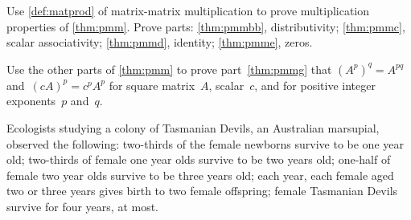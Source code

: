 \begin{exercise} \label{ex:} 
Use \autoref{def:matprod} of matrix-matrix multiplication to prove multiplication properties of \autoref{thm:pmm}. 
Prove parts: \ref{thm:pmmbb}, distributivity; \ref{thm:pmmc}, scalar associativity; \ref{thm:pmmd}, identity; \ref{thm:pmme}, zeros.
\end{exercise}

\begin{exercise} \label{ex:} 
Use the other parts of \autoref{thm:pmm} to prove part~\ref{thm:pmmg} that \((A^p)^q=A^{pq}\) and~\((cA)^p=c^pA^p\) for square matrix~\(A\), scalar~\(c\), and for positive integer exponents~\(p\) and~\(q\).
\end{exercise}


\begin{exercise} \label{ex:} 
Ecologists studying a colony of Tasmanian Devils, an Australian marsupial, observed the following:
two-thirds of the female newborns survive to be one year old;
two-thirds of female one year olds survive to be two years old;
one-half of female two year olds survive to be three years old;
each year, each female aged two or three years gives birth to two female offspring;
female Tasmanian Devils survive for four years, at most.


\end{exercise}
